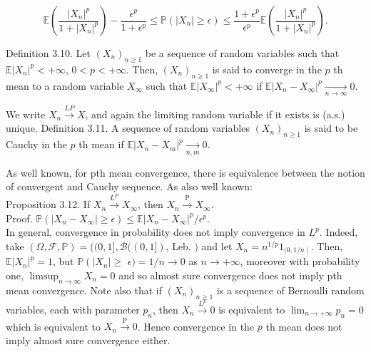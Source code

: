 \documentclass[11pt]{amsbook}
\theoremstyle{plain}%
\theoremstyle{definition}
\theoremstyle{remark}
\begin{document}
$$
\mathbb{E}\left(\frac{\left|X_{n}\right|^{p}}{1+\left|X_{n}\right|^{p}}\right)-\frac{\epsilon^{p}}{1+\epsilon^{p}} \leq \mathbb{P}\left(\left|X_{n}\right| \geq \epsilon\right) \leq \frac{1+\epsilon^{p}}{\epsilon^{p}} \mathbb{E}\left(\frac{\left|X_{n}\right|^{p}}{1+\left|X_{n}\right|^{p}}\right) .
$$

Definition 3.10. Let $\left(X_{n}\right)_{n \geq 1}$ be a sequence of random variables such that $\mathbb{E}\left|X_{n}\right|^{p}<+\infty$, $0<p<+\infty$. Then, $\left(X_{n}\right)_{n \geq 1}$ is said to converge in the $p$ th mean to a random variable $X_{\infty}$ such that $\mathbb{E}\left|X_{\infty}\right|^{p}<+\infty$ if $\mathbb{E}\left|X_{n}-X_{\infty}\right|^{p} \underset{n \rightarrow \infty}{\longrightarrow} 0$.

We write $X_{n} \xrightarrow{L P} X$, and again the limiting random variable if it exists is (a.s.) unique. Definition 3.11. A sequence of random variables $\left(X_{n}\right)_{n \geq 1}$ is said to be Cauchy in the $p$ th mean if $\mathbb{E}\left|X_{n}-X_{m}\right|^{p} \underset{n, m}{\longrightarrow} 0$.

As well known, for pth mean convergence, there is equivalence between the notion of convergent and Cauchy sequence. As also well known:\\
Proposition 3.12. If $X_{n} \xrightarrow{L^{P}} X_{\infty}$, then $X_{n} \xrightarrow{\mathrm{P}} X_{\infty}$.\\
Proof. $\mathbb{P}\left(\left|X_{n}-X_{\infty}\right| \geq \epsilon\right) \leq \mathbb{E}\left|X_{n}-X_{\infty}\right|^{p} / \epsilon^{p}$.\\
In general, convergence in probability does not imply convergence in $L^{p}$. Indeed, take $(\Omega, \mathcal{F}, \mathbb{P})=((0,1], \mathcal{B}((0,1])$, Leb. $)$ and let $X_{n}=n^{1 / p} 1_{(0,1 / n \mid}$. Then, $\mathbb{E}\left|X_{n}\right|^{p}=1$, but $\mathbb{P}\left(\left|X_{n}\right| \geq\right.$ $\epsilon)=1 / n \rightarrow 0$ as $n \rightarrow+\infty$, moreover with probability one, $\limsup _{n \rightarrow \infty} X_{n}=0$ and so almost sure convergence does not imply pth mean convergence. Note also that if $\left(X_{n}\right)_{n \geq 1}$ is a sequence of Bernoulli random variables, each with parameter $p_{n}$, then $X_{n} \xrightarrow{L^{p}} 0$ is equivalent to $\lim _{n \rightarrow+\infty} p_{n}=0$ which is equivalent to $X_{n} \xrightarrow{\mathrm{P}} 0$. Hence convergence in the $p$ th mean does not imply almost sure convergence either.
\end{document}
